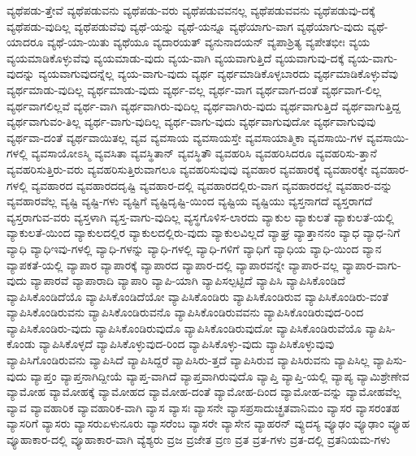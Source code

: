 {ವ್ಯಥೆಪಡು-ತ್ತೇವೆ
ವ್ಯಥೆಪಡುವನು
ವ್ಯಥೆಪಡು-ವರು
ವ್ಯಥೆಪಡುವವನಲ್ಲ
ವ್ಯಥೆಪಡುವವನು
ವ್ಯಥೆಪಡುವು-ದಕ್ಕೆ
ವ್ಯಥೆಪಡು-ವುದಿಲ್ಲ
ವ್ಯಥೆಪಡುವೆವು
ವ್ಯಥೆ-ಯನ್ನು
ವ್ಯಥೆ-ಯನ್ನೂ
ವ್ಯಥೆಯಾಗು-ವಾಗ
ವ್ಯಥೆಯಾಗು-ವುದು
ವ್ಯಥೆ-ಯಾದರೂ
ವ್ಯಥೆ-ಯಾ-ಯಿತು
ವ್ಯಥೆಯೂ
ವ್ಯದಾರಯತ್
ವ್ಯನುನಾದಯನ್
ವ್ಯಪಾಶ್ರಿತ್ಯ
ವ್ಯಪೇತಭೀಃ
ವ್ಯಯ
ವ್ಯಯಮಾಡಿಕೊಳ್ಳುವೆವು
ವ್ಯಯಮಾಡು-ವುದು
ವ್ಯಯ-ವಾಗಿ
ವ್ಯಯವಾಗುತ್ತಿದೆ
ವ್ಯಯವಾಗುವು-ದಕ್ಕೆ
ವ್ಯಯ-ವಾಗು-ವುದನ್ನು
ವ್ಯಯವಾಗುವುದನ್ನೆಲ್ಲ
ವ್ಯಯ-ವಾಗು-ವುದು
ವ್ಯರ್ಥ
ವ್ಯರ್ಥಮಾಡಿಕೊಳ್ಳಬಾರದು
ವ್ಯರ್ಥಮಾಡಿಕೊಳ್ಳುವೆವು
ವ್ಯರ್ಥಮಾಡು-ವುದಿಲ್ಲ
ವ್ಯರ್ಥಮಾಡು-ವುದು
ವ್ಯರ್ಥ-ವಲ್ಲ
ವ್ಯರ್ಥ-ವಾಗ
ವ್ಯರ್ಥವಾಗ-ದಂತೆ
ವ್ಯರ್ಥವಾಗ-ಲಿಲ್ಲ
ವ್ಯರ್ಥವಾಗಲಿಲ್ಲವೆ
ವ್ಯರ್ಥ-ವಾಗಿ
ವ್ಯರ್ಥವಾಗಿರು-ವುದಿಲ್ಲ
ವ್ಯರ್ಥವಾಗಿರು-ವುದು
ವ್ಯರ್ಥವಾಗುತ್ತಿದೆ
ವ್ಯರ್ಥವಾಗುತ್ತಿದ್ದ
ವ್ಯರ್ಥವಾಗುವಂ-ತಿಲ್ಲ
ವ್ಯರ್ಥ-ವಾಗು-ವುದಿಲ್ಲ
ವ್ಯರ್ಥ-ವಾಗು-ವುದು
ವ್ಯರ್ಥವಾಗುವುದೋ
ವ್ಯರ್ಥವಾಗುವುವು
ವ್ಯರ್ಥವಾ-ದಂತೆ
ವ್ಯರ್ಥವಾಯಿತಲ್ಲ
ವ್ಯವ
ವ್ಯವಸಾಯ
ವ್ಯವಸಾಯಸ್ತೇ
ವ್ಯವಸಾಯಾತ್ಮಿಕಾ
ವ್ಯವಸಾಯಿ-ಗಳ
ವ್ಯವಸಾಯಿ-ಗಳಲ್ಲಿ
ವ್ಯವಸಾಯೋಽಸ್ಮಿ
ವ್ಯವಸಿತಾ
ವ್ಯವಸ್ಥಿತಾನ್
ವ್ಯವಸ್ಥಿತೌ
ವ್ಯವಹರಿಸಿ
ವ್ಯವಹರಿಸಿದರೂ
ವ್ಯವಹರಿಸು-ತ್ತಾನೆ
ವ್ಯವಹರಿಸುತ್ತಿರು-ವರು
ವ್ಯವಹರಿಸುತ್ತಿರುವಾಗಲೂ
ವ್ಯವಹರಿಸುವುವು
ವ್ಯವಹಾರ
ವ್ಯವಹಾರಕ್ಕೆ
ವ್ಯವಹಾರಕ್ಕೇ
ವ್ಯವಹಾರ-ಗಳಲ್ಲಿ
ವ್ಯವಹಾರದ
ವ್ಯವಹಾರದದೃಷ್ಟಿ
ವ್ಯವಹಾರ-ದಲ್ಲಿ
ವ್ಯವಹಾರದಲ್ಲಿರು-ವಾಗ
ವ್ಯವಹಾರದಲ್ಲೆ
ವ್ಯವಹಾರ-ವನ್ನು
ವ್ಯವಹಾರವೆಲ್ಲ
ವ್ಯಷ್ಟಿ
ವ್ಯಷ್ಟಿ-ಗಳು
ವ್ಯಷ್ಟಿಗೆ
ವ್ಯಷ್ಟಿದೃಷ್ಟಿ-ಯಿಂದ
ವ್ಯಷ್ಟಿಯ
ವ್ಯಷ್ಟಿಯು
ವ್ಯಸ್ತನಾಗದೆ
ವ್ಯಸ್ತರಾಗದೆ
ವ್ಯಸ್ತರಾಗುವ-ವರು
ವ್ಯಸ್ತಳಾಗಿ
ವ್ಯಸ್ತ-ವಾಗು-ವುದಿಲ್ಲ
ವ್ಯಸ್ಥಗೊಳಿಸ-ಲಾರದು
ವ್ಯಾಕುಲ
ವ್ಯಾಕುಲತೆ
ವ್ಯಾಕುಲತೆ-ಯಲ್ಲಿ
ವ್ಯಾಕುಲತೆ-ಯಿಂದ
ವ್ಯಾಕುಲದಲ್ಲಿರ
ವ್ಯಾಕುಲದಲ್ಲಿರು-ವುದು
ವ್ಯಾಕುಲವಿಲ್ಲದೆ
ವ್ಯಾಘ್ರ
ವ್ಯಾತ್ತಾನನಂ
ವ್ಯಾಧ
ವ್ಯಾಧ-ನಿಗೆ
ವ್ಯಾಧಿ
ವ್ಯಾಧಿಇವು-ಗಳಲ್ಲಿ
ವ್ಯಾಧಿ-ಗಳನ್ನು
ವ್ಯಾಧಿ-ಗಳಲ್ಲಿ
ವ್ಯಾಧಿ-ಗಳಿಗೆ
ವ್ಯಾಧಿಗೆ
ವ್ಯಾಧಿಯ
ವ್ಯಾಧಿ-ಯಿಂದ
ವ್ಯಾನ
ವ್ಯಾಪಕತೆ-ಯಲ್ಲಿ
ವ್ಯಾಪಾರ
ವ್ಯಾಪಾರಕ್ಕೆ
ವ್ಯಾಪಾರದ
ವ್ಯಾಪಾರ-ದಲ್ಲಿ
ವ್ಯಾಪಾರವನ್ನೇ
ವ್ಯಾಪಾರ-ವಲ್ಲ
ವ್ಯಾಪಾರ-ವಾಗು-ವುದು
ವ್ಯಾಪಾರವೆ
ವ್ಯಾಪಾರಾದಿ
ವ್ಯಾಪಾರಿ
ವ್ಯಾಪಿ-ಯಾಗಿ
ವ್ಯಾಪಿಸಲ್ಪಟ್ಟಿದೆ
ವ್ಯಾಪಿಸಿ
ವ್ಯಾಪಿಸಿಕೊಂಡಿದೆ
ವ್ಯಾಪಿಸಿಕೊಂಡಿದೆಯೊ
ವ್ಯಾಪಿಸಿಕೊಂಡಿದೆಯೋ
ವ್ಯಾಪಿಸಿಕೊಂಡಿರು
ವ್ಯಾಪಿಸಿಕೊಂಡಿರುವ
ವ್ಯಾಪಿಸಿಕೊಂಡಿರು-ವಂತೆ
ವ್ಯಾಪಿಸಿಕೊಂಡಿರುವನು
ವ್ಯಾಪಿಸಿಕೊಂಡಿರುವನೊ
ವ್ಯಾಪಿಸಿಕೊಂಡಿರುವವನು
ವ್ಯಾಪಿಸಿಕೊಂಡಿರುವುದ-ರಿಂದ
ವ್ಯಾಪಿಸಿಕೊಂಡಿರು-ವುದು
ವ್ಯಾಪಿಸಿಕೊಂಡಿರುವುದೊ
ವ್ಯಾಪಿಸಿಕೊಂಡಿರುವುದೋ
ವ್ಯಾಪಿಸಿಕೊಂಡಿರುವೆಯೊ
ವ್ಯಾಪಿಸಿ-ಕೊಂಡು
ವ್ಯಾಪಿಸಿಕೊಳ್ಳದೆ
ವ್ಯಾಪಿಸಿಕೊಳ್ಳುವುದ-ರಿಂದ
ವ್ಯಾಪಿಸಿಕೊಳ್ಳು-ವುದು
ವ್ಯಾಪಿಸಿಕೊಳ್ಳುವುವು
ವ್ಯಾಪಿಸಿಗೊಂಡಿರುವನು
ವ್ಯಾಪಿಸಿದೆ
ವ್ಯಾಪಿಸಿದ್ದರೆ
ವ್ಯಾಪಿಸಿರು-ತ್ತದೆ
ವ್ಯಾಪಿಸಿರುವ
ವ್ಯಾಪಿಸಿರುವನು
ವ್ಯಾಪಿಸಿಲ್ಲ
ವ್ಯಾಪಿಸು-ವುದು
ವ್ಯಾಪ್ತಂ
ವ್ಯಾಪ್ತನಾಗಿದ್ದೀಯೆ
ವ್ಯಾಪ್ತ-ವಾಗಿದೆ
ವ್ಯಾಪ್ತವಾಗಿರುವುದೊ
ವ್ಯಾಪ್ತಿ
ವ್ಯಾಪ್ತಿ-ಯಲ್ಲಿ
ವ್ಯಾಪ್ಯ
ವ್ಯಾಮಿಶ್ರೇಣೇವ
ವ್ಯಾಮೋಹ
ವ್ಯಾಮೋಹಕ್ಕೆ
ವ್ಯಾಮೋಹದ
ವ್ಯಾಮೋಹ-ದಂತೆ
ವ್ಯಾಮೋಹ-ದಿಂದ
ವ್ಯಾಮೋಹ-ವನ್ನು
ವ್ಯಾಮೋಹವೆಲ್ಲ
ವ್ಯಾವ
ವ್ಯಾವಹಾರಿಕ
ವ್ಯಾವಹಾರಿಕ-ವಾಗಿ
ವ್ಯಾಸ
ವ್ಯಾಸಃ
ವ್ಯಾಸನೇ
ವ್ಯಾಸಪ್ರಸಾದುಚ್ಛ್ರತವಾನಿಮಂ
ವ್ಯಾಸರ
ವ್ಯಾಸರಂತಹ
ವ್ಯಾಸರಿಗೆ
ವ್ಯಾಸರು
ವ್ಯಾಸರುಏಳುನೂರು
ವ್ಯಾಸರೆಂಬ
ವ್ಯಾಸರೇ
ವ್ಯಾಸೇನ
ವ್ಯಾಹರನ್
ವ್ಯುದಸ್ಯ
ವ್ಯೂಢಂ
ವ್ಯೂಢಾಂ
ವ್ಯೂಹ
ವ್ಯೂಹಾಕಾರ-ದಲ್ಲಿ
ವ್ಯೂಹಾಕಾರ-ವಾಗಿ
ವ್ಯೆಶ್ಯರು
ವ್ರಜ
ವ್ರಜೇತ
ವ್ರಣ
ವ್ರತ
ವ್ರತ-ಗಳು
ವ್ರತ-ದಲ್ಲಿ
ವ್ರತನಿಯಮ-ಗಳು
}
